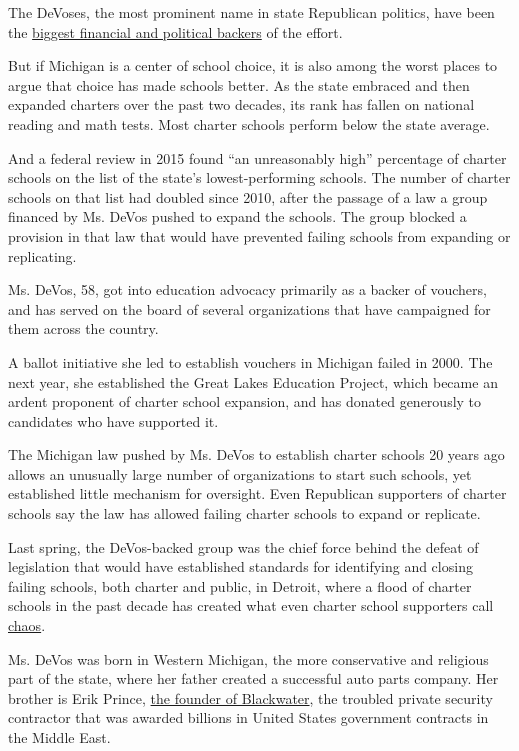 The DeVoses, the most prominent name in state Republican politics, have
been the
\href{http://www.metrotimes.com/Blogs/archives/2016/05/17/lawmakers-deciding-the-future-of-detroit-schools-accepted-thousands-from-pro-charter-devos-family}{biggest
financial and political backers} of the effort.

But if Michigan is a center of school choice, it is also among the worst
places to argue that choice has made schools better. As the state
embraced and then expanded charters over the past two decades, its rank
has fallen on national reading and math tests. Most charter schools
perform below the state average.

And a federal review in 2015 found ``an unreasonably high'' percentage
of charter schools on the list of the state's lowest-performing schools.
The number of charter schools on that list had doubled since 2010, after
the passage of a law a group financed by Ms. DeVos pushed to expand the
schools. The group blocked a provision in that law that would have
prevented failing schools from expanding or replicating.

Ms. DeVos, 58, got into education advocacy primarily as a backer of
vouchers, and has served on the board of several organizations that have
campaigned for them across the country.

A ballot initiative she led to establish vouchers in Michigan failed in
2000. The next year, she established the Great Lakes Education Project,
which became an ardent proponent of charter school expansion, and has
donated generously to candidates who have supported it.

The Michigan law pushed by Ms. DeVos to establish charter schools 20
years ago allows an unusually large number of organizations to start
such schools, yet established little mechanism for oversight. Even
Republican supporters of charter schools say the law has allowed failing
charter schools to expand or replicate.

Last spring, the DeVos-backed group was the chief force behind the
defeat of legislation that would have established standards for
identifying and closing failing schools, both charter and public, in
Detroit, where a flood of charter schools in the past decade has created
what even charter school supporters call
\href{http://www.nytimes.com/2016/06/29/us/for-detroits-children-more-school-choice-but-not-better-schools.html?smid=fb-shar}{chaos}.

Ms. DeVos was born in Western Michigan, the more conservative and
religious part of the state, where her father created a successful auto
parts company. Her brother is Erik Prince,
\href{http://www.nytimes.com/2015/04/15/world/middleeast/blackwaters-legacy-goes-beyond-public-view.html}{the
founder of Blackwater}, the troubled private security contractor that
was awarded billions in United States government contracts in the Middle
East.

